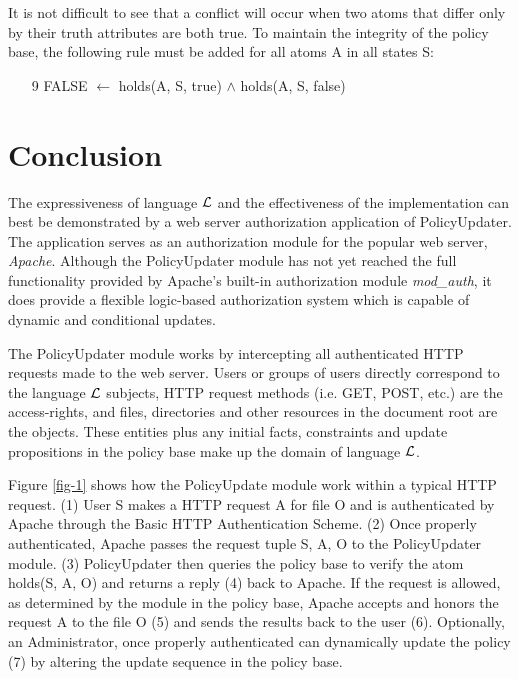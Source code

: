 \documentclass{llncs}
\begin{document}
    It is not difficult to see that a conflict will occur when two atoms that
    differ only by their truth attributes are both true. To maintain the
    integrity of the policy base, the following rule must be added for all
    atoms A in all states S:

    \begin{enumerate}
      \item[9]
        FALSE $\leftarrow$ holds(A, S, true) $\land$ holds(A, S, false)
    \end{enumerate}

  \section{Conclusion}

    The expressiveness of language $\cal{L}$ and the effectiveness of the
    implementation can best be demonstrated by a web server authorization
    application of PolicyUpdater. The application serves as an authorization
    module for the popular web server, \emph{Apache}\footnotemark. Although the
    PolicyUpdater module has not yet reached the full functionality provided
    by Apache's built-in authorization module \emph{mod\_auth}, it does provide
    a flexible logic-based authorization system which is capable of dynamic and
    conditional updates.

    The PolicyUpdater module works by intercepting all authenticated HTTP
    requests made to the web server. Users or groups of users directly
    correspond to the language $\cal{L}$ subjects, HTTP request methods
    (i.e. GET, POST, etc.) are the access-rights, and files, directories
    and other resources in the document root are the objects. These entities
    plus any initial facts, constraints and update propositions in the 
    policy base make up the domain of language $\cal{L}$.

    Figure \ref{fig-1} shows how the PolicyUpdate module work within a typical
    HTTP request. (1) User S makes a HTTP request A for file O and is
    authenticated by Apache through the Basic HTTP Authentication Scheme. (2)
    Once properly authenticated, Apache passes the request tuple {S, A, O} to
    the PolicyUpdater module. (3) PolicyUpdater then queries the policy base
    to verify the atom holds(S, A, O) and returns a reply (4) back to Apache.
    If the request is allowed, as determined by the module in the policy base,
    Apache accepts and honors the request A to the file O (5) and sends the
    results back to the user (6). Optionally, an Administrator, once properly
    authenticated can dynamically update the policy (7) by altering the
    update sequence in the policy base.
\end{document}
